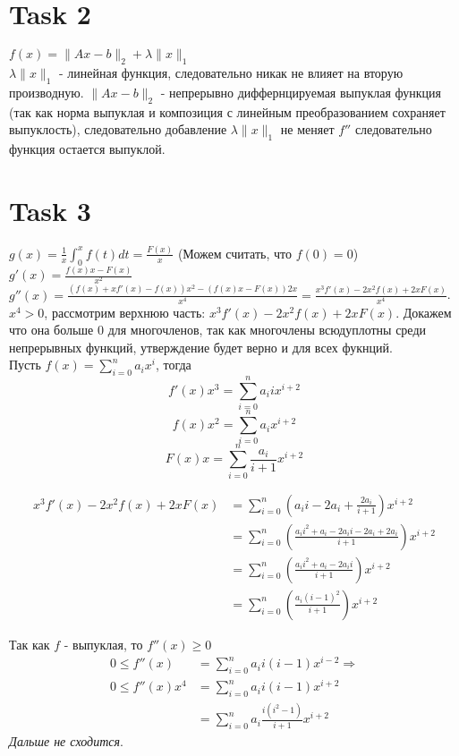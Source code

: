 \documentclass[12pt]{exam}
\begin{document}
\section*{Task 2}
$f(x) = \|A x - b \|_2 + \lambda \| x \|_1$ \\
$\lambda \| x \|_1 $ - линейная функция, 
следовательно никак не влияет на вторую производную. 
$\| A x - b \|_2 $ - непрерывно диффернцируемая выпуклая функция 
(так как норма выпуклая и композиция с линейным преобразованием сохраняет выпуклость), 
следовательно добавление $\lambda \| x \|_1$ не меняет $f''$ следовательно функция остается выпуклой.

\section*{Task 3}
$g(x) = \frac{1}{x} \int_0^x f(t) dt = \frac{F(x)}{x} $ (Можем считать, что $f(0) = 0$)\\
$g'(x) = \frac{f(x)x - F(x)}{x^2}$ \\
$g''(x) = \frac{(f(x) + xf'(x) - f(x))x^2 - (f(x)x - F(x))2x}{x^4} = \frac{x^3f'(x) - 2x^2f(x) + 2xF(x)}{x^4}$. \\
$x^4 > 0$, рассмотрим верхнюю часть: $ x^3f'(x) - 2x^2f(x) + 2xF(x)$.
Докажем что она больше $0$ для многочленов, так как многочлены всюдуплотны среди непрерывных функций, утверждение будет верно и для всех фукнций.\\
Пусть $f(x) = \sum_{i=0}^n a_i x^{i}$, тогда 
$$f'(x)x^3 = \sum_{i=0}^n a_i i x^{i + 2}$$
$$f(x)x^2 = \sum_{i=0}^n a_i x^{i + 2}$$
$$F(x)x = \sum_{i=0}^n \frac{a_i}{i + 1} x^{i + 2}$$

\begin{align*}
    x^3f'(x) - 2x^2f(x) + 2xF(x) 
        &= \sum_{i=0}^n (a_i i - 2 a_i + \frac{2 a_i}{i + 1}) x^{i + 2} \\
        &= \sum_{i=0}^n (\frac{a_i i^2 + a_i - 2 a_i i - 2a_i + 2 a_i}{i + 1}) x^{i + 2} \\
        &= \sum_{i=0}^n (\frac{a_i i^2 + a_i - 2 a_i i}{i + 1}) x^{i + 2} \\
        &= \sum_{i=0}^n (\frac{a_i (i - 1)^2}{i + 1}) x^{i + 2} 
\end{align*}
    
Так как $f$ - выпуклая, то $f''(x) \geq 0$
\begin{align*}
    0 \leq f''(x) 
        &= \sum_{i = 0}^n a_i i (i - 1) x^{i - 2} \Rightarrow \\
    0 \leq f''(x) x^4 
        &= \sum_{i = 0}^n a_i i (i - 1) x^{i + 2} \\
        &= \sum_{i = 0}^n a_i \frac{i(i^2 - 1)}{i + 1} x^{i + 2} 
\end{align*}
\textit{Дальше не сходится}.
\end{document}
